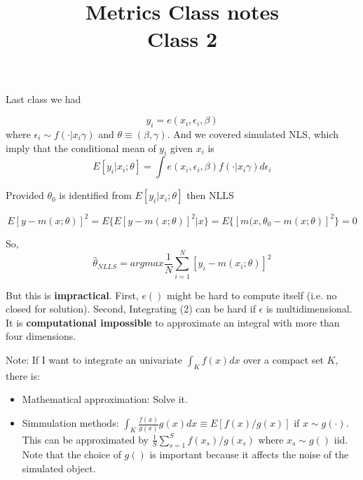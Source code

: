 \documentclass[12pt]{article}
\title{\Large{\textbf{Metrics Class notes}} \\
Class 2}
\begin{document}
\maketitle

Last class we had 

\begin{equation}
	y_i = e(x_i, \epsilon_i, \beta) 
\end{equation}
	where $\epsilon_i \sim f(\cdot | x_i \gamma )$ and $\theta \equiv (\beta, \gamma)$. And we covered simulated NLS, which imply that the conditional mean of $y_i$ given $x_i$ is 
	\begin{equation}
		E[y_i | x_i; \theta] = \int e(x_i, \epsilon_i, \beta) f(\cdot | x_i \gamma ) d \epsilon_i 
	\end{equation}
	
	Provided $\theta_0$ is identified from $E[y_i | x_i; \theta]$ then NLLS
	
	\begin{equation}
		E[y - m(x;\theta)]^2 = E \{ E[y - m(x;\theta)]^2 | x \} = E \{ [m(x,\theta_0 - m(x; \theta)]^2 \} = 0
	\end{equation}
	
	So, 
	\begin{equation}
		\hat{\theta}_{NLLS} = argmax \frac{1}{N} \sum^N_{i=1} [y_i - m(x_i; \theta)]^2
	\end{equation}
	
	But this is \textbf{impractical}. First, $e()$ might be hard to compute itself (i.e. no closed for solution). Second, Integrating (2) can be hard if $\epsilon$ is multidimensional. It is \textbf{computational impossible} to approximate an integral with more than four dimensions.
	
	Note: If I want to integrate an univariate $\int_K f(x) dx$ over a compact set $K$, there is:
	\begin{itemize}
		\item Mathematical approximation: Solve it. 
		\item Simmulation methods: $\int_K \frac{f(x)}{g(x)} g(x) dx \equiv E[f(x)/g(x)]$ if $x \sim g(\cdot)$. This can be approximated by $\frac{1}{S} \sum^S_{s=1} f(x_s)/g(x_s)$ where $x_s \sim g()$ iid. Note that the choice of $g()$ is important because it affects the noise of the simulated object.    
	\end{itemize}
	
\end{document}
